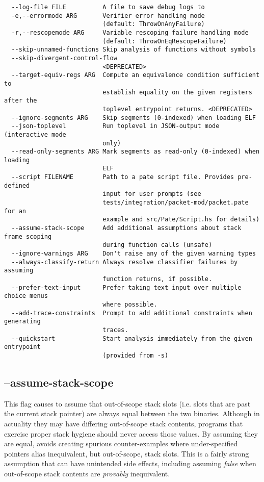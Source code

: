 \begin{verbatim}
  --log-file FILE          A file to save debug logs to
  -e,--errormode ARG       Verifier error handling mode
                           (default: ThrowOnAnyFailure)
  -r,--rescopemode ARG     Variable rescoping failure handling mode
                           (default: ThrowOnEqRescopeFailure)
  --skip-unnamed-functions Skip analysis of functions without symbols
  --skip-divergent-control-flow
                           <DEPRECATED>
  --target-equiv-regs ARG  Compute an equivalence condition sufficient to
                           establish equality on the given registers after the
                           toplevel entrypoint returns. <DEPRECATED>
  --ignore-segments ARG    Skip segments (0-indexed) when loading ELF
  --json-toplevel          Run toplevel in JSON-output mode (interactive mode
                           only)
  --read-only-segments ARG Mark segments as read-only (0-indexed) when loading
                           ELF
  --script FILENAME        Path to a pate script file. Provides pre-defined
                           input for user prompts (see
                           tests/integration/packet-mod/packet.pate for an
                           example and src/Pate/Script.hs for details)
  --assume-stack-scope     Add additional assumptions about stack frame scoping
                           during function calls (unsafe)
  --ignore-warnings ARG    Don't raise any of the given warning types
  --always-classify-return Always resolve classifier failures by assuming
                           function returns, if possible.
  --prefer-text-input      Prefer taking text input over multiple choice menus
                           where possible.
  --add-trace-constraints  Prompt to add additional constraints when generating
                           traces.
  --quickstart             Start analysis immediately from the given entrypoint
                           (provided from -s)
\end{verbatim}

\subsection{--assume-stack-scope}

This flag causes \pate{} to assume that out-of-scope stack slots 
(i.e. slots that are past the current stack pointer) are always equal between
the two binaries.
Although in actuality they may have differing out-of-scope stack
contents, programs that exercise proper stack hygiene should never
access those values. By assuming they are equal, \pate{} avoids 
creating spurious counter-examples where under-specified pointers
alias inequivalent, but out-of-scope, stack slots.
This is a fairly strong assumption that can have unintended side effects,
including assuming \emph{false} when out-of-scope stack contents are
\emph{provably} inequivalent.


